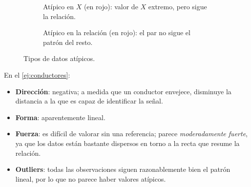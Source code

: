 \begin{figure}[H]
  \centering
  \begin{subfigure}[t]{0.45\linewidth}
    \centering
    \caption{Atípico en $X$ (en rojo): valor de $X$ extremo, pero sigue la relación.}
  \end{subfigure}\hfill
  \begin{subfigure}[t]{0.45\linewidth}
    \centering
    \caption{Atípico en la relación (en rojo): el par no sigue el patrón del resto.}
  \end{subfigure}
  \caption{Tipos de datos atípicos.}
\end{figure}

\begin{ejemplo}
  En el \cref{ej:conductores}:
  \begin{itemize}
    \item \textbf{Dirección}: negativa; a medida que un conductor envejece, disminuye la
      distancia a la que es capaz de identificar la señal.
    \item \textbf{Forma}: aparentemente lineal.
    \item \textbf{Fuerza}: es difícil de valorar sin una referencia; parece
      \emph{moderadamente fuerte}, ya que los datos están bastante dispersos en torno a la
      recta que resume la relación.
    \item \textbf{Outliers}: todas las observaciones siguen razonablemente bien el patrón
      lineal, por lo que no parece haber valores atípicos.
  \end{itemize}
  \begin{center}
  \end{center}
\end{ejemplo}

